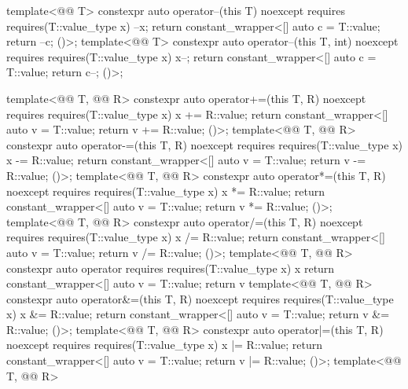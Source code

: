 \begin{codeblock}
{{    template<@@ T>
      constexpr auto operator--(this T) noexcept
        requires requires(T::value_type x) { --x; }
          { return constant_wrapper<[] { auto c = T::value; return --c; }()>{}; }
    template<@@ T>
      constexpr auto operator--(this T, int) noexcept
        requires requires(T::value_type x) { x--; }
          { return constant_wrapper<[] { auto c = T::value; return c--; }()>{}; }

    template<@@ T, @@ R>
      constexpr auto operator+=(this T, R) noexcept
        requires requires(T::value_type x) { x += R::value; }
          { return constant_wrapper<[] { auto v = T::value; return v += R::value; }()>{}; }
    template<@@ T, @@ R>
      constexpr auto operator-=(this T, R) noexcept
        requires requires(T::value_type x) { x -= R::value; }
          { return constant_wrapper<[] { auto v = T::value; return v -= R::value; }()>{}; }
    template<@@ T, @@ R>
      constexpr auto operator*=(this T, R) noexcept
        requires requires(T::value_type x) { x *= R::value; }
          { return constant_wrapper<[] { auto v = T::value; return v *= R::value; }()>{}; }
    template<@@ T, @@ R>
      constexpr auto operator/=(this T, R) noexcept
        requires requires(T::value_type x) { x /= R::value; }
          { return constant_wrapper<[] { auto v = T::value; return v /= R::value; }()>{}; }
    template<@@ T, @@ R>
      constexpr auto operator%
        requires requires(T::value_type x) { x %
          { return constant_wrapper<[] { auto v = T::value; return v %
    template<@@ T, @@ R>
      constexpr auto operator&=(this T, R) noexcept
        requires requires(T::value_type x) { x &= R::value; }
          { return constant_wrapper<[] { auto v = T::value; return v &= R::value; }()>{}; }
    template<@@ T, @@ R>
      constexpr auto operator|=(this T, R) noexcept
        requires requires(T::value_type x) { x |= R::value; }
          { return constant_wrapper<[] { auto v = T::value; return v |= R::value; }()>{}; }
    template<@@ T, @@ R>
}}}}}
\end{codeblock}
